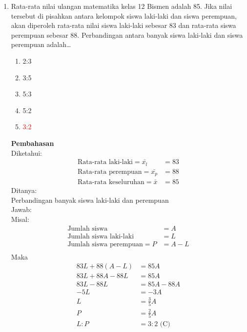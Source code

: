 \documentclass{report}
\newcommand{\options}[5]{
\begin{enumerate}[label=\alph*.]
	\item #1
	\item #2
	\item #3
	\item #4
	\item #5
\end{enumerate}
}
\newcommand{\pemb}{ \textbf{Pembahasan} \\}
\begin{document}
\begin{enumerate}
\item Rata-rata nilai ulangan matematika kelas 12 Bismen adalah 85. Jika nilai tersebut di pisahkan antara kelompok siswa laki-laki dan siswa perempuan, akan diperoleh rata-rata nilai siswa laki-laki sebesar 83 dan rata-rata siswa perempuan sebesar 88. Perbandingan antara banyak siswa laki-laki dan siswa perempuan adalah\ldots
\options
{2:3}
{3:5}
{5:3}
{5:2}
{\textcolor{red}{3:2}}
\pemb
Diketahui: \\
\begin{align*}
	\text{Rata-rata laki-laki} = \bar{x_{l}} &= 83 \\
	\text{Rata-rata perempuan} = \bar{x_{p}} &= 88 \\
	\text{Rata-rata keseluruhan} = \bar{x} &= 85
\end{align*}
Ditanya: \\
Perbandingan banyak siswa laki-laki dan perempuan \\
Jawab: \\
Misal:
\begin{align*}
	\text{Jumlah siswa} &= A \\
	\text{Jumlah siswa laki-laki} &= L \\
	\text{Jumlah siswa perempuan} = P &= A-L \\
\end{align*}
Maka
\begin{align*}
	83L+88(A-L)&=85A\\
	83L+88A-88L&=85A\\
	83L-88L&=85A-88A\\
	-5L&=-3A\\
	L&=\frac{3}{5}A \\
	P&=\frac{2}{5}A \\
	L:P&=3:2 \text{ (C)}
\end{align*}


\end{enumerate}
\end{document}
